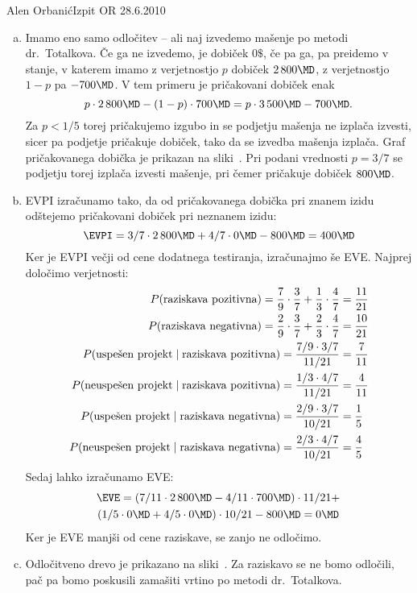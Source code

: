 \begin{naloga}{Alen Orbanić}{Izpit OR 28.6.2010}
\begin{odgovor}
\begin{enumerate}[(a)]
\item Imamo eno samo odločitev
-- ali naj izvedemo mašenje po metodi dr.~Totalkova.
Če ga ne izvedemo, je dobiček $0 \$$,
če pa ga, pa preidemo v stanje,
v katerem imamo z verjetnostjo $p$ dobiček $2\,800 \MD$,
z verjetnostjo $1-p$ pa $-700 \MD$.
V tem primeru je pričakovani dobiček enak
$$
p \cdot 2\,800 \MD - (1-p) \cdot 700 \MD
=  p \cdot 3\,500 \MD - 700 \MD .
$$
Za $p < 1/5$ torej pričakujemo izgubo
in se podjetju mašenja ne izplača izvesti,
sicer pa podjetje pričakuje dobiček, tako da se izvedba mašenja izplača.
Graf pričakovanega dobička je prikazan na sliki~\fig[bp-graf].
Pri podani vrednosti $p = 3/7$ se podjetju torej izplača izvesti mašenje,
pri čemer pričakuje dobiček $800 \MD$.

\item EVPI izračunamo tako,
da od pričakovanega dobička pri znanem izidu
odštejemo pričakovani dobiček pri neznanem izidu:
$$
\EVPI = 3/7 \cdot 2\,800 \MD + 4/7 \cdot 0 \MD - 800 \MD = 400 \MD
$$
Ker je EVPI večji od cene dodatnega testiranja, izračunajmo še EVE.
Najprej določimo verjetnosti:
\begin{align*}
P(\text{raziskava pozitivna}) =
{7 \over 9} \cdot {3 \over 7} + {1 \over 3} \cdot {4 \over 7}
&= {11 \over 21} \\
P(\text{raziskava negativna}) =
{2 \over 9} \cdot {3 \over 7} + {2 \over 3} \cdot {4 \over 7}
&= {10 \over 21} \\
P(\text{uspešen projekt} \mid \text{raziskava pozitivna}) =
{7/9 \cdot 3/7 \over 11/21} &= {7 \over 11} \\
P(\text{neuspešen projekt} \mid \text{raziskava pozitivna}) =
{1/3 \cdot 4/7 \over 11/21} &= {4 \over 11} \\
P(\text{uspešen projekt} \mid \text{raziskava negativna}) =
{2/9 \cdot 3/7 \over 10/21} &= {1 \over 5} \\
P(\text{neuspešen projekt} \mid \text{raziskava negativna}) =
{2/3 \cdot 4/7 \over 10/21} &= {4 \over 5}
\end{align*}
Sedaj lahko izračunamo EVE:
\begin{multline*}
\EVE = (7/11 \cdot 2\,800 \MD - 4/11 \cdot 700 \MD) \cdot 11/21 + \\
(1/5 \cdot 0 \MD + 4/5 \cdot 0 \MD) \cdot 10/21 - 800 \MD = 0 \MD
\end{multline*}
Ker je EVE manjši od cene raziskave, se zanjo ne odločimo.

\item Odločitveno drevo je prikazano na sliki~\fig[bp-drevo].
Za raziskavo se ne bomo odločili,
pač pa bomo poskusili zamašiti vrtino po metodi dr.~Totalkova.
\end{enumerate}
%
\begin{slika}
\pgfslika[bp-graf]
\end{slika}
%
\begin{slika}
\makebox[\textwidth][c]{
\pgfslika[bp-drevo]
}
\end{slika}
\end{odgovor}
\end{naloga}
